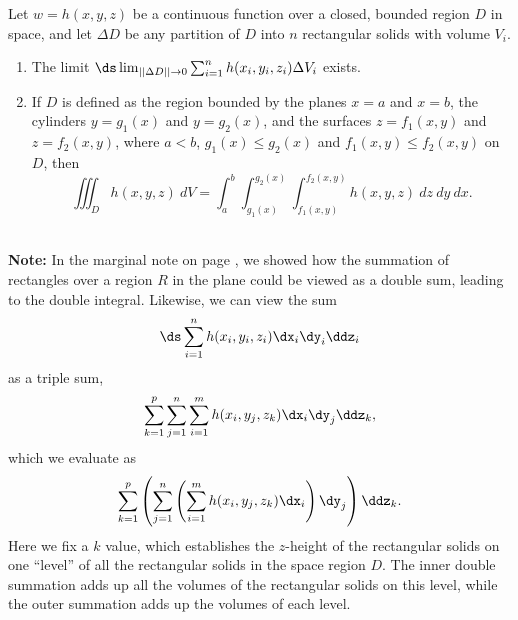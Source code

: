 {Let $w=h(x,y,z)$ be a continuous function over a closed, bounded region $D$ in space, and let $\Delta D$ be any partition of $D$ into $n$ rectangular solids with volume $V_i$.

\begin{enumerate}
\item		The limit $\ds \lim_{||\Delta D||\to 0}\sum_{i=1}^n h(x_i,y_i,z_i)\Delta V_i$ exists.

\item		If $D$ is defined as the region bounded by the planes $x=a$ and $x=b$, the cylinders $y=g_1(x)$ and $y=g_2(x)$, and the surfaces $z=f_1(x,y)$ and $z=f_2(x,y)$, where $a<b$, $g_1(x)\leq g_2(x)$ and $f_1(x,y)\leq f_2(x,y)$ on $D$, then
	$$\iiint_D h(x,y,z)\ dV = \int_a^b\int_{g_1(x)}^{g_2(x)}\int_{f_1(x,y)}^{f_2(x,y)} h(x,y,z)\ dz\ dy\ dx.$$

\end{enumerate}
}\\


\textbf{Note:} In the marginal note on page \pageref{note:doubleint}, we showed how the summation of rectangles over a region $R$ in the plane could be viewed as a double sum, leading to the double integral. Likewise, we can view the sum $$\ds \sum_{i=1}^nh(x_i,y_i,z_i)\dx_i\dy_i\ddz_i$$ as a triple sum, $$\sum_{k=1}^p\sum_{j=1}^n\sum_{i=1}^mh(x_i,y_j,z_k)\dx_i\dy_j\ddz_k,$$ which we evaluate as
$$\sum_{k=1}^p\left(\sum_{j=1}^n\left(\sum_{i=1}^mh(x_i,y_j,z_k)\dx_i\right)\dy_j\right)\ddz_k.$$
Here we fix a $k$ value, which establishes the $z$-height of the rectangular solids on one ``level'' of all the rectangular solids in the space region $D$. The inner double summation adds up all the volumes of the rectangular solids on this level, while the outer summation adds up the volumes of each level.

